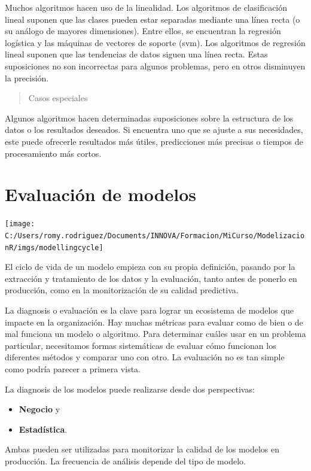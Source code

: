 \documentclass[]{book}
\providecommand{\tightlist}{%
  \setlength{\itemsep}{0pt}\setlength{\parskip}{0pt}}
\begin{document}
Muchos algoritmos hacen uso de la linealidad. Los algoritmos de clasificación lineal suponen que las clases pueden estar separadas mediante una línea recta (o su análogo de mayores dimensiones). Entre ellos, se encuentran la regresión logística y las máquinas de vectores de soporte (svm). Los algoritmos de regresión lineal suponen que las tendencias de datos siguen una línea recta. Estas suposiciones no son incorrectas para algunos problemas, pero en otros disminuyen la precisión.

\begin{quote}
Casos especiales
\end{quote}

Algunos algoritmos hacen determinadas suposiciones sobre la estructura de los datos o los resultados deseados. Si encuentra uno que se ajuste a sus necesidades, este puede ofrecerle resultados más útiles, predicciones más precisas o tiempos de procesamiento más cortos.

\hypertarget{evaluacion-de-modelos}{%
\chapter{Evaluación de modelos}\label{evaluacion-de-modelos}}

\texttt{[image: C:/Users/romy.rodriguez/Documents/INNOVA/Formacion/MiCurso/ModelizacionR/imgs/modellingcycle]}

El ciclo de vida de un modelo empieza con su propia definición, pasando por la extracción y tratamiento de los datos y la evaluación, tanto antes de ponerlo en producción, como en la monitorización de su calidad predictiva.

La diagnosis o evaluación es la clave para lograr un ecosistema de modelos que impacte en la organización. Hay muchas métricas para evaluar como de bien o de mal funciona un modelo o algoritmo. Para determinar cuáles usar en un problema particular, necesitamos formas sistemáticas de evaluar cómo funcionan los diferentes métodos y comparar uno con otro. La evaluación no es tan simple como podría parecer a primera vista.

La diagnosis de los modelos puede realizarse desde dos perspectivas:

\begin{itemize}
\tightlist
\item
  \textbf{Negocio} y
\item
  \textbf{Estadística}.
\end{itemize}

Ambas pueden ser utilizadas para monitorizar la calidad de los modelos en producción. La frecuencia de análisis depende del tipo de modelo.
\end{document}
